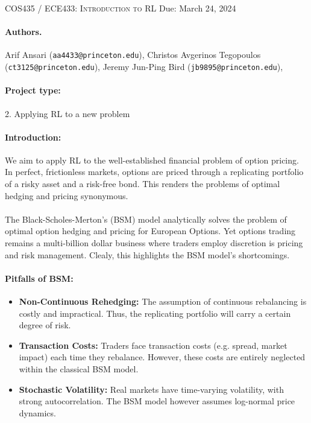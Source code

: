 \documentclass{article}
\begin{document}
\newcommand{\lectureTitle}{Project Proposal: Optimal Option Hedging and Pricing}
\newcommand{\lectureDate}{Due: March 24, 2024}

\textsc{COS435 / ECE433: Introduction to RL} \hfill \lectureDate
\vspace{1em}

\maketitle

\paragraph{Authors.} Arif Ansari (\texttt{aa4433@princeton.edu}), Christos Avgerinos Tegopoulos (\texttt{ct3125@princeton.edu}), Jeremy Jun-Ping Bird (\texttt{jb9895@princeton.edu}), 

\paragraph{Project type:}
2. 
Applying RL to a new problem

\paragraph{Introduction:}
We aim to apply RL to the well-established financial problem of option pricing. In perfect, frictionless markets, options are priced through a replicating portfolio of a risky asset and a risk-free bond. This renders the problems of optimal hedging and pricing synonymous.\\\\
The Black-Scholes-Merton's (BSM) model analytically solves the problem of optimal option hedging and pricing for European Options. Yet options trading remains a multi-billion dollar business where traders employ discretion is pricing and risk management. Clealy, this highlights the BSM model's shortcomings.
\paragraph{Pitfalls of BSM:}
\begin{itemize}
    \item \textbf{Non-Continuous Rehedging:} The assumption of continuous rebalancing is costly and impractical. Thus, the replicating portfolio will carry a certain degree of risk.
    \item \textbf{Transaction Costs:} Traders face transaction costs (e.g. spread, market impact) each time they rebalance. However, these costs are entirely neglected within the classical BSM model.
    \item \textbf{Stochastic Volatility:} Real markets have time-varying volatility, with strong autocorrelation. The BSM model however assumes log-normal price dynamics.
\end{itemize}
\end{document}
